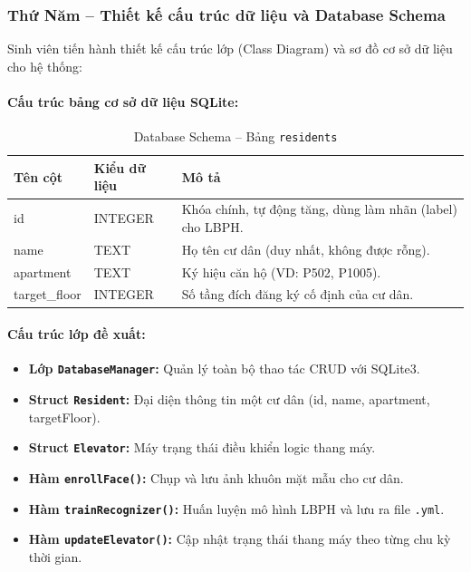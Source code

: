 \documentclass[12pt,a4paper]{article}
\begin{document}
\subsubsection{Thứ Năm -- Thiết kế cấu trúc dữ liệu và Database Schema}

Sinh viên tiến hành thiết kế cấu trúc lớp (Class Diagram) và sơ đồ cơ sở dữ liệu cho hệ thống:

\paragraph{Cấu trúc bảng cơ sở dữ liệu SQLite:}
\begin{table}[H]
    \centering
    \renewcommand{\arraystretch}{1.4}
    \begin{tabular}{|>{\ttfamily}l|>{\ttfamily}l|p{8cm}|}
        \hline
        \rowcolor{lightblue}
        \textbf{Tên cột} & \textbf{Kiểu dữ liệu} & \textbf{Mô tả} \\
        \hline
        id & INTEGER & Khóa chính, tự động tăng, dùng làm nhãn (label) cho LBPH. \\
        \hline
        name & TEXT & Họ tên cư dân (duy nhất, không được rỗng). \\
        \hline
        apartment & TEXT & Ký hiệu căn hộ (VD: P502, P1005). \\
        \hline
        target\_floor & INTEGER & Số tầng đích đăng ký cố định của cư dân. \\
        \hline
    \end{tabular}
    \caption{Database Schema -- Bảng \texttt{residents}}
\end{table}

\paragraph{Cấu trúc lớp đề xuất:}
\begin{itemize}[leftmargin=1.5cm]
    \item \textbf{Lớp \texttt{DatabaseManager}:} Quản lý toàn bộ thao tác CRUD với SQLite3.
    \item \textbf{Struct \texttt{Resident}:} Đại diện thông tin một cư dân (id, name, apartment, targetFloor).
    \item \textbf{Struct \texttt{Elevator}:} Máy trạng thái điều khiển logic thang máy.
    \item \textbf{Hàm \texttt{enrollFace()}:} Chụp và lưu ảnh khuôn mặt mẫu cho cư dân.
    \item \textbf{Hàm \texttt{trainRecognizer()}:} Huấn luyện mô hình LBPH và lưu ra file \texttt{.yml}.
    \item \textbf{Hàm \texttt{updateElevator()}:} Cập nhật trạng thái thang máy theo từng chu kỳ thời gian.
\end{itemize}
\end{document}
